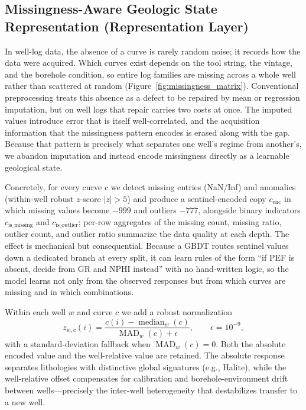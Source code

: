 \documentclass[bdcc,article,submit,pdftex,moreauthors]{Definitions/mdpi}
\begin{document}
\subsection{Missingness-Aware Geologic State Representation (Representation Layer)}
\label{sec:repr}
In well-log data, the absence of a curve is rarely random noise; it records how the data were
acquired. Which curves exist depends on the tool string, the vintage, and the borehole
condition, so entire log families are missing across a whole well rather than scattered at
random (Figure~\ref{fig:missingness_matrix}). Conventional preprocessing treats this absence as a
defect to be repaired by mean or regression imputation, but on well logs that repair carries
two costs at once. The imputed values introduce error that is itself well-correlated, and the
acquisition information that the missingness pattern encodes is erased along with the gap.
Because that pattern is precisely what separates one well's regime from another's, we abandon
imputation and instead encode missingness directly as a learnable geological state.

Concretely, for every curve $c$ we detect missing entries (NaN/Inf) and anomalies (within-well
robust $z$-score $|z|>5$) and produce a sentinel-encoded copy $c_\text{enc}$ in which missing
values become $-999$ and outliers $-777$, alongside binary indicators $c_\text{is\_missing}$
and $c_\text{is\_outlier}$; per-row aggregates of the missing count, missing ratio, outlier
count, and outlier ratio summarize the data quality at each depth. The effect is mechanical
but consequential. Because a GBDT routes sentinel values down a dedicated branch at every
split, it can learn rules of the form ``if PEF is absent, decide from GR and NPHI instead''
with no hand-written logic, so the model learns not only from the observed responses but from
which curves are missing and in which combinations.

Within each well $w$ and curve $c$ we add a robust normalization
\begin{equation}
z_{w,c}(i) = \frac{c(i)-\operatorname{median}_w(c)}{\operatorname{MAD}_w(c)+\epsilon},\qquad \epsilon=10^{-9},
\label{eq:zscore}
\end{equation}
with a standard-deviation fallback when $\operatorname{MAD}_w(c)=0$. Both the absolute
encoded value and the well-relative value are retained. The absolute response separates
lithologies with distinctive global signatures (e.g., Halite), while the well-relative offset
compensates for calibration and borehole-environment drift between wells---precisely the
inter-well heterogeneity that destabilizes transfer to a new well.
\end{document}
